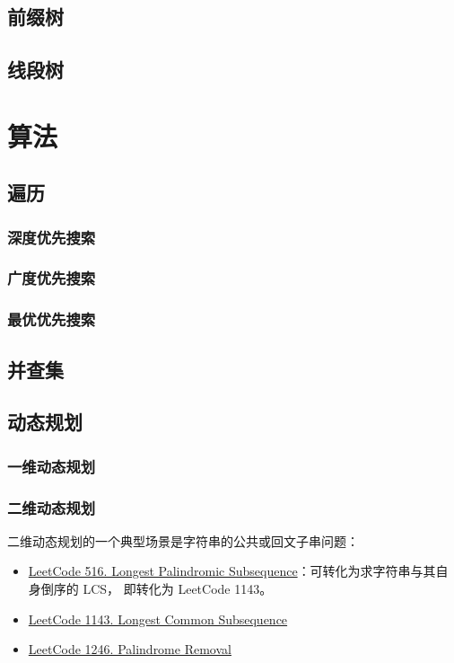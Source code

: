 \section{前缀树}
\section{线段树}

\chapter{算法}
\section{遍历}
\subsection{深度优先搜索}

\subsection{广度优先搜索}

\subsection{最优优先搜索}

\section{并查集}

\section{动态规划}

\subsection{一维动态规划}

\subsection{二维动态规划}
二维动态规划的一个典型场景是字符串的公共或回文子串问题：
\begin{itemize}
  \item
    \href{https://leetcode.com/problems/longest-palindromic-subsequence/}{LeetCode
      516. Longest Palindromic Subsequence}：可转化为求字符串与其自身倒序的 LCS，
    即转化为 LeetCode 1143。
  \item
    \href{https://leetcode.com/problems/longest-common-subsequence/}{LeetCode 1143. Longest Common Subsequence}
  \item
    \href{https://leetcode.com/problems/palindrome-removal/}{LeetCode 1246. Palindrome Removal}
\end{itemize}

